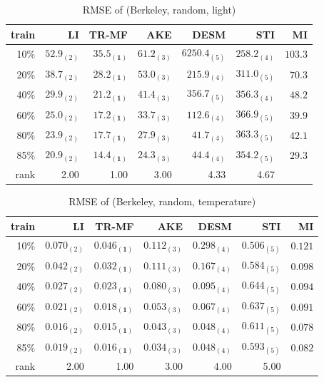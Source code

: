 \begin{table} [htbp]
\setlength{\tabcolsep}{2pt}
\centering
\caption{RMSE of (Berkeley, random, light)}
\label{table:berkeley_random_light}
\begin{tabular}{ r |  r r r r r r}
	train	&LI	&TR-MF	&AKE	&DESM	&STI &MI\\ \hline
	10\% & $ 52.9_{(2)} $ & $ \mathbf{ 35.5_{(1)} } $ & $ 61.2_{(3)} $ & $ 6250.4_{(5)} $ & $ 258.2_{(4)} $ &$103.3$ \\
	20\% & $ 38.7_{(2)} $ & $ \mathbf{ 28.2_{(1)} } $ & $ 53.0_{(3)} $ & $ 215.9_{(4)} $ & $ 311.0_{(5)} $ &$70.3$\\
	40\% & $ 29.9_{(2)} $ & $ \mathbf{ 21.2_{(1)} } $ & $ 41.4_{(3)} $ & $ 356.7_{(5)} $ & $ 356.3_{(4)} $ &$48.2$\\
	60\% & $ 25.0_{(2)} $ & $ \mathbf{ 17.2_{(1)} } $ & $ 33.7_{(3)} $ & $ 112.6_{(4)} $ & $ 366.9_{(5)} $ &$39.9$\\
	80\% & $ 23.9_{(2)} $ & $ \mathbf{ 17.7_{(1)} } $ & $ 27.9_{(3)} $ & $ 41.7_{(4)} $ & $ 363.3_{(5)} $ &$42.1$\\
	85\% & $ 20.9_{(2)} $ & $ \mathbf{ 14.4_{(1)} } $ & $ 24.3_{(3)} $ & $ 44.4_{(4)} $ & $ 354.2_{(5)} $ &$29.3$\\ \hline
	rank &2.00 &1.00 &3.00 &4.33 &4.67 \\
\end{tabular}
\end{table}

\begin{table}[htbp]
\setlength{\tabcolsep}{2pt}
\centering
\caption{RMSE of (Berkeley, random, temperature)}
\label{table:berkeley_random_tem}
\begin{tabular}{ r | r r r r r r}
	train	&LI	&TR-MF	&AKE	&DESM	&STI &MI\\ \hline
	10\% & $ 0.070_{(2)} $ & $ \mathbf{ 0.046_{(1)} } $ & $ 0.112_{(3)} $ & $ 0.298_{(4)} $ & $ 0.506_{(5)} $ &$0.121$\\
	20\% & $ 0.042_{(2)} $ & $ \mathbf{ 0.032_{(1)} } $ & $ 0.111_{(3)} $ & $ 0.167_{(4)} $ & $ 0.584_{(5)} $ &$0.098$\\
	40\% & $ 0.027_{(2)} $ & $ \mathbf{ 0.023_{(1)} } $ & $ 0.080_{(3)} $ & $ 0.095_{(4)} $ & $ 0.644_{(5)} $ &$0.094$\\
	60\% & $ 0.021_{(2)} $ & $ \mathbf{ 0.018_{(1)} } $ & $ 0.053_{(3)} $ & $ 0.067_{(4)} $ & $ 0.637_{(5)} $ &$0.091$\\
	80\% & $ 0.016_{(2)} $ & $ \mathbf{ 0.015_{(1)} } $ & $ 0.043_{(3)} $ & $ 0.048_{(4)} $ & $ 0.611_{(5)} $ &$0.078$\\
	85\% & $ 0.019_{(2)} $ & $ \mathbf{ 0.016_{(1)} } $ & $ 0.034_{(3)} $ & $ 0.048_{(4)} $ & $ 0.593_{(5)} $ &$0.082$\\ \hline
	rank &2.00 &1.00 &3.00 &4.00 &5.00 \\
\end{tabular}
\end{table}

